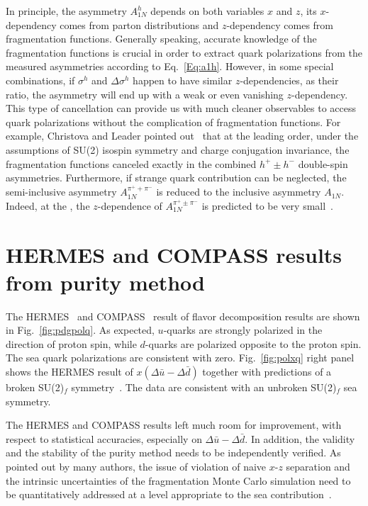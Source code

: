 In principle, the asymmetry $A_{1N}^h$ depends on both
variables $x$ and $z$, its $x$-dependency comes from parton distributions and
$z$-dependency comes from fragmentation functions. 
Generally speaking, accurate knowledge of
the fragmentation functions is crucial in order to extract quark polarizations from the measured
asymmetries according to Eq.~\ref{Eq:a1h}.  However, in some special combinations, if $\sigma^h$ and
$\Delta \sigma^h$ happen to have similar $z$-dependencies, as their ratio, the asymmetry  
will end up with a weak or even vanishing $z$-dependency. This type of cancellation can provide
 us with much cleaner
 observables to access quark polarizations without the complication of fragmentation functions. 
For example,     
Christova and Leader pointed out~\cite{leader2} that at the leading order, 
under the assumptions of SU(2) isospin symmetry and charge conjugation invariance, 
the fragmentation functions 
canceled exactly in the combined $h^+ \pm h^-$ double-spin
asymmetries. Furthermore, if strange quark contribution can be neglected, 
the semi-inclusive asymmetry $A_{1N}^{\pi^+ + \pi^-}$ is reduced
to the inclusive asymmetry $A_{1N}$.  
Indeed, at the \nloo, the 
$z$-dependence of $A_{1N}^{\pi^+ \pm \pi^-}$
is predicted to be very small~\cite{sassotnlo}.

\section{HERMES and COMPASS results from \lo purity method }
The HERMES~\cite{Airapetian:2004zf} and COMPASS~\cite{Alekseev:2010ub} result of flavor decomposition results are shown 
in Fig.~\ref{fig:pdgpolq}. 
As expected, $u$-quarks are strongly polarized in the direction of 
proton spin, while $d$-quarks are polarized 
opposite to the proton spin.  The sea quark polarizations are consistent with zero. 
Fig.~\ref{fig:polxq} right panel shows the HERMES result of $x(\Delta\bar{u} -
\Delta\bar{d})$ together with predictions of a broken SU(2)$_f$
symmetry~\cite{lit:goeke,cao}.  The data are
consistent with an unbroken SU(2)$_f$ sea symmetry.   

The HERMES and COMPASS results left much room for improvement, with respect to statistical accuracies, 
especially on $\Delta \bar{u}- \Delta \bar{d}$.
In addition, the validity and the stability of the \lo purity method needs 
to be independently verified. As pointed out by many authors, the issue of
\lo violation of naive $x$-$z$ separation and the intrinsic uncertainties of the 
fragmentation Monte Carlo simulation need to be quantitatively addressed
at a level appropriate to the sea contribution~\cite{leader2}.

